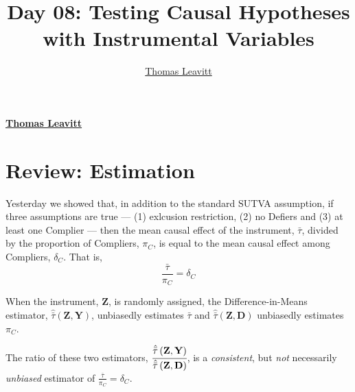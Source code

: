 \documentclass[12pt,leqno]{article}
\title{Day 08: Testing Causal Hypotheses with Instrumental Variables  }
\author{\Large \href{mailto:t.leavitt718@gmail.com}{Thomas Leavitt}\vspace{0.05in} \newline\normalsize\emph{}  }
\date{}
\newcommand*{\authorfont}{\fontfamily{phv}\selectfont}
\theoremstyle{newstyle}
\begin{document}
	
%

{%
\setlength{\parindent}{0pt}
\thispagestyle{plain}
{\fontsize{18}{20}\selectfont\raggedright 
\maketitle  %

}

{
   \vskip 13.5pt\relax \normalsize\fontsize{11}{12} 
\textbf{\authorfont \href{mailto:t.leavitt718@gmail.com}{Thomas Leavitt}} \hskip 15pt \emph{\small }   

}

}





\vskip 6.5pt

\noindent  \hypertarget{review-estimation}{%
\section{Review: Estimation}\label{review-estimation}}

Yesterday we showed that, in addition to the standard SUTVA assumption,
if three assumptions are true --- (1) exlcusion restriction, (2) no
Defiers and (3) at least one Complier --- then the mean causal effect of
the instrument, \(\bar{\tau}\), divided by the proportion of Compliers,
\(\pi_C\), is equal to the mean causal effect among Compliers,
\(\delta_C\). That is, \begin{equation}
\frac{\bar{\tau}}{\pi_C} = \delta_C
\end{equation}

When the instrument, \(\mathbf{Z}\), is randomly assigned, the
Difference-in-Means estimator,
\(\hat{\bar{\tau}}\left(\mathbf{Z}, \mathbf{Y}\right)\), unbiasedly
estimates \(\bar{\tau}\) and
\(\hat{\bar{\tau}}\left(\mathbf{Z}, \mathbf{D}\right)\) unbiasedly
estimates \(\pi_C\).

The ratio of these two estimators,
\(\cfrac{\hat{\bar{\tau}}\left(\mathbf{Z}, \mathbf{Y}\right)}{\hat{\bar{\tau}}\left(\mathbf{Z}, \mathbf{D}\right)}\),
is a \textit{consistent}, but \textit{not} necessarily \textit{unbiased}
estimator of \(\frac{\bar{\tau}}{\pi_C} = \delta_C\).
\end{document}
